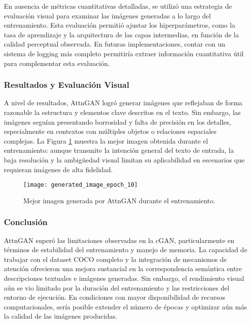 En ausencia de métricas cuantitativas detalladas, se utilizó una estrategia de evaluación visual para examinar las imágenes generadas a lo largo del entrenamiento. Esta evaluación permitió ajustar los hiperparámetros, como la tasa de aprendizaje y la arquitectura de las capas intermedias, en función de la calidad perceptual observada. En futuras implementaciones, contar con un sistema de logging más completo permitiría extraer información cuantitativa útil para complementar esta evaluación.

\subsubsection{Resultados y Evaluación Visual}
A nivel de resultados, AttnGAN logró generar imágenes que reflejaban de forma razonable la estructura y elementos clave descritos en el texto. Sin embargo, las imágenes seguían presentando borrosidad y falta de precisión en los detalles, especialmente en contextos con múltiples objetos o relaciones espaciales complejas. La Figura \ref{fig:attn} muestra la mejor imagen obtenida durante el entrenamiento: aunque transmite la intención general del texto de entrada, la baja resolución y la ambigüedad visual limitan su aplicabilidad en escenarios que requieran imágenes de alta fidelidad.

\begin{figure}[H]
\centering
\texttt{[image: generated\_image\_epoch\_10]}
\caption{Mejor imagen generada por AttnGAN durante el entrenamiento.}
\label{fig:attn}
\end{figure}

\subsubsection{Conclusión}
AttnGAN superó las limitaciones observadas en la cGAN, particularmente en términos de estabilidad del entrenamiento y manejo de memoria. La capacidad de trabajar con el dataset COCO completo y la integración de mecanismos de atención ofrecieron una mejora sustancial en la correspondencia semántica entre descripciones textuales e imágenes generadas. Sin embargo, el rendimiento visual aún se vio limitado por la duración del entrenamiento y las restricciones del entorno de ejecución. En condiciones con mayor disponibilidad de recursos computacionales, sería posible extender el número de épocas y optimizar aún más la calidad de las imágenes producidas.
